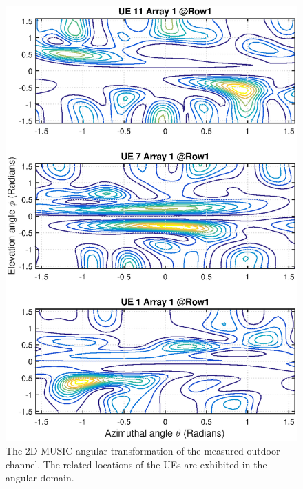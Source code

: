 \begin{figure}[t!]
	\centering
	\includegraphics[width=1\linewidth]{figures/2DMUSICcollocated_row1_array1.eps}
	\caption{The 2D-MUSIC angular transformation of the measured outdoor channel. The related locations of the UEs are exhibited in the angular domain.}
	\label{fig:2DMUSIC-measured-collocated-channel}
\end{figure}




